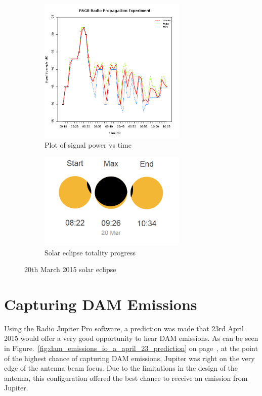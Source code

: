 %
\begin{figure}	
	\centering
	\begin{subfigure}[t]{7cm}
		\centering
		\includegraphics[width=7cm]{images/67}
		\caption{Plot of signal power vs time}
		\label{fig:signal_power_v_time_radio_propagation}
	\end{subfigure}
	\quad
	\begin{subfigure}[t]{7cm}
		\centering
		\includegraphics[width=7cm]{images/88}
		\caption{Solar eclipse totality progress}
		\label{fig:solar_eclipse_totality_plot}
	\end{subfigure}
	\caption{20th March 2015 solar eclipse}
	\label{fig:solar_eclipse_20_march_2015}
\end{figure}
%


\newpage
\section*{Capturing DAM Emissions}
Using the Radio Jupiter Pro software, a prediction was made that 23rd April 2015 would offer a very good opportunity to hear \gls{DAM} emissions. As can be seen in Figure.~\ref{fig:dam_emissions_io_a_april_23_prediction} on page~\pageref{fig:dam_emissions_io_a_april_23_prediction}, at the point of the highest chance of capturing \gls{DAM} emissions, Jupiter was right on the very edge of the antenna beam focus. Due to the limitations in the design of the antenna, this configuration offered the best chance to receive an emission from Jupiter.

